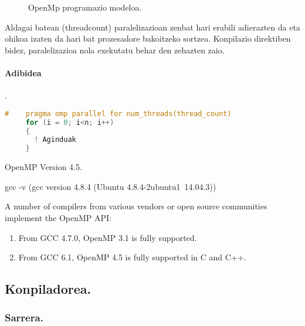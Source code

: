  
 \begin{figure}[h]
 \centering
  \caption[OpenMp programazio modeloa.]{\small OpenMp programazio modeloa.}
 \label{fig:forkjoin}
 \end{figure}

Aldagai batean (threadcount) paralelizazioan zenbat hari erabili adierazten da eta ohikoa izaten da hari bat prozesadore bakoitzeko sortzea.  Konpilazio direktiben bidez,  paralelizazioa nola exekutatu behar den zehazten zaio.

\paragraph*{\textbf{Adibidea}}.

\begin{lstlisting}[language=C]
#    pragma omp parallel for num_threads(thread_count) 
     for (i = 0; i<n; i++)
     {
       ! Aginduak 
     }
\end{lstlisting}

OpenMP Version 4.5.	

gcc -v (gcc version 4.8.4 (Ubuntu 4.8.4-2ubuntu1~14.04.3))

A number of compilers from various vendors or open source communities implement the OpenMP API:

\begin{enumerate}
\item From GCC 4.7.0, OpenMP 3.1 is fully supported. 

\item From GCC 6.1, OpenMP 4.5 is fully supported in C and C++.

\end{enumerate}   


\subsection{Konpiladorea.}

\subsubsection*{Sarrera.}

